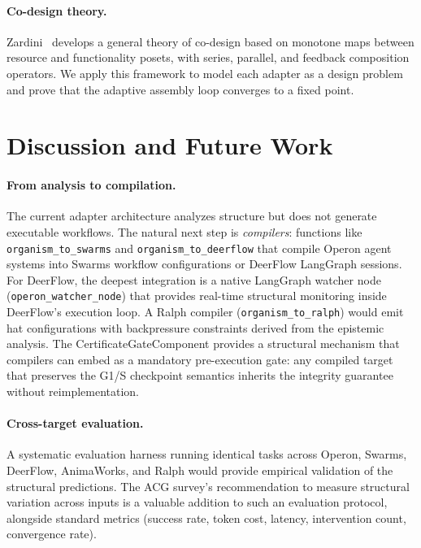 \documentclass[11pt]{article}
\begin{document}
\paragraph{Co-design theory.}
Zardini~\cite{zardini2023codesign} develops a general theory of co-design
based on monotone maps between resource and functionality posets, with
series, parallel, and feedback composition operators.  We apply this
framework to model each adapter as a design problem and prove that the
adaptive assembly loop converges to a fixed point.

\section{Discussion and Future Work}\label{sec:discussion}

\paragraph{From analysis to compilation.}
The current adapter architecture analyzes structure but does not generate
executable workflows.  The natural next step is \emph{compilers}: functions
like \texttt{organism\_to\_swarms} and \texttt{organism\_to\_deerflow} that
compile Operon agent systems into Swarms workflow configurations or DeerFlow
LangGraph sessions.  For DeerFlow, the deepest integration is a native
LangGraph watcher node (\texttt{operon\_watcher\_node}) that provides
real-time structural monitoring inside DeerFlow's execution loop.
A Ralph compiler (\texttt{organism\_to\_ralph}) would emit hat
configurations with backpressure constraints derived from the epistemic
analysis.  The CertificateGateComponent provides a structural mechanism
that compilers can embed as a mandatory pre-execution gate: any compiled
target that preserves the G1/S checkpoint semantics inherits the
integrity guarantee without reimplementation.

\paragraph{Cross-target evaluation.}
A systematic evaluation harness running identical tasks across Operon,
Swarms, DeerFlow, AnimaWorks, and Ralph would provide empirical validation
of the structural predictions.  The ACG survey's recommendation to
measure structural variation across inputs is a valuable addition to such
an evaluation protocol, alongside standard metrics (success rate, token
cost, latency, intervention count, convergence rate).
\end{document}
